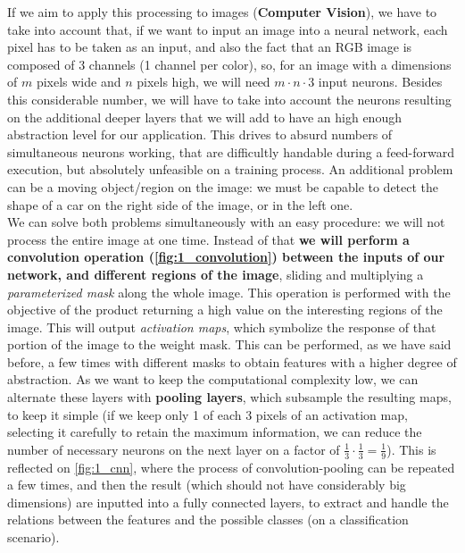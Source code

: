 If we aim to apply this processing to images (\textbf{Computer Vision}), we have to take into account that, if we want to input an image into a neural network, each pixel has to be taken as an input, and also the fact that an RGB image is composed of 3 channels (1 channel per color), so, for an image with a dimensions of $m$ pixels wide and $n$ pixels high, we will need $m\cdot n \cdot 3$ input neurons. Besides this considerable number, we will have to take into account the neurons resulting on the additional deeper layers that we will add to have an high enough abstraction level for our application. This drives to absurd numbers of simultaneous neurons working, that are difficultly handable during a feed-forward execution, but absolutely unfeasible on a training process. An additional problem can be a moving object/region on the image: we must be capable to detect the shape of a car on the right side of the image, or in the left one.\\

We can solve both problems simultaneously with an easy procedure: we will not process the entire image at one time. Instead of that \textbf{we will perform a convolution operation (\autoref{fig:1_convolution}) between the inputs of our network, and different regions of the image}, sliding and multiplying a \emph{parameterized mask} along the whole image. This operation is performed with the objective of the product returning a high value on the interesting regions of the image. This will output \emph{activation maps}, which symbolize the response of that portion of the image to the weight mask. This can be performed, as we have said before, a few times with different masks to obtain features with a higher degree of abstraction. As we want to keep the computational complexity low, we can alternate these layers with \textbf{pooling layers}, which subsample the resulting maps, to keep it simple (if we keep only 1 of each 3 pixels of an activation map, selecting it carefully to retain the maximum information, we can reduce the number of necessary neurons on the next layer on a factor of $\frac{1}{3} \cdot \frac{1}{3} = \frac{1}{9}$). This is reflected on \autoref{fig:1_cnn}, where the process of convolution-pooling can be repeated a few times, and then the result (which should not have considerably big dimensions) are inputted into a fully connected layers, to extract and handle the relations between the features and the possible classes (on a classification scenario).\\


